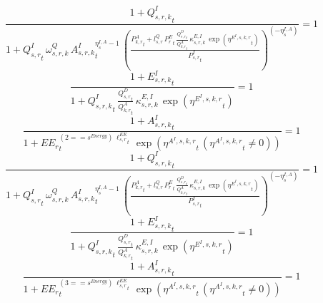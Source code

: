 \begin{dmath}
\frac{1+{{Q^{I}_{s,r,k}}}_{t}}{1+{{Q^{I}_{s,r}}}_{t}\, {{\omega^{Q}_{s,r,k}}}\, {{A^{I}_{s,r,k}}}_{t}^{{{\eta^{I,A}_{s}}}-1}\, \left(\frac{{{P^{A}_{k,r}}}_{t}+{{l^{Q}_{s,r}}}\, {{P^E_r}}_{t}\, \frac{{{Q^{D}_{s,r}}}_{t}}{{{Q^{A}_{k,r}}}_{t}}\, {{\kappa^{E,I}_{s,r,k}}}\, \exp\left({{\eta^{E^{I},s,k,r}}}_{t}\right)}{{{P^{I}_{s,r}}}_{t}}\right)^{\left(-{{\eta^{I,A}_{s}}}\right)}}=1
\end{dmath}
\noindent[name= `regional emissions caused by using intermediates from aggregate sector 4 1 2']
\begin{dmath}
\frac{1+{{E^I_{s,r,k}}}_{t}}{1+{{Q^{I}_{s,r,k}}}_{t}\, \frac{{{Q^{D}_{s,r}}}_{t}}{{{Q^{A}_{k,r}}}_{t}}\, {{\kappa^{E,I}_{s,r,k}}}\, \exp\left({{\eta^{E^{I},s,k,r}}}_{t}\right)}=1
\end{dmath}
\noindent[name= `productivity of intermediates in subsector 4 region 1 from sector 2']
\begin{dmath}
\frac{1+{{A^{I}_{s,r,k}}}_{t}}{1+{{EE_r}}_{t}^{\left(2=={{s^{Energy}}}\right)\, {{\ell^{EE}_{s,r}}}_{t}}\, \exp\left({{\eta^{A^{I},s,k,r}}}_{t}\, \left({{\eta^{A^{I},s,k,r}}}_{t}\neq 0\right)\right)}=1
\end{dmath}
\noindent[name= `regional sector demand for intermediates from aggregate sector 4 1 3']
\begin{dmath}
\frac{1+{{Q^{I}_{s,r,k}}}_{t}}{1+{{Q^{I}_{s,r}}}_{t}\, {{\omega^{Q}_{s,r,k}}}\, {{A^{I}_{s,r,k}}}_{t}^{{{\eta^{I,A}_{s}}}-1}\, \left(\frac{{{P^{A}_{k,r}}}_{t}+{{l^{Q}_{s,r}}}\, {{P^E_r}}_{t}\, \frac{{{Q^{D}_{s,r}}}_{t}}{{{Q^{A}_{k,r}}}_{t}}\, {{\kappa^{E,I}_{s,r,k}}}\, \exp\left({{\eta^{E^{I},s,k,r}}}_{t}\right)}{{{P^{I}_{s,r}}}_{t}}\right)^{\left(-{{\eta^{I,A}_{s}}}\right)}}=1
\end{dmath}
\noindent[name= `regional emissions caused by using intermediates from aggregate sector 4 1 3']
\begin{dmath}
\frac{1+{{E^I_{s,r,k}}}_{t}}{1+{{Q^{I}_{s,r,k}}}_{t}\, \frac{{{Q^{D}_{s,r}}}_{t}}{{{Q^{A}_{k,r}}}_{t}}\, {{\kappa^{E,I}_{s,r,k}}}\, \exp\left({{\eta^{E^{I},s,k,r}}}_{t}\right)}=1
\end{dmath}
\noindent[name= `productivity of intermediates in subsector 4 region 1 from sector 3']
\begin{dmath}
\frac{1+{{A^{I}_{s,r,k}}}_{t}}{1+{{EE_r}}_{t}^{\left(3=={{s^{Energy}}}\right)\, {{\ell^{EE}_{s,r}}}_{t}}\, \exp\left({{\eta^{A^{I},s,k,r}}}_{t}\, \left({{\eta^{A^{I},s,k,r}}}_{t}\neq 0\right)\right)}=1
\end{dmath}
